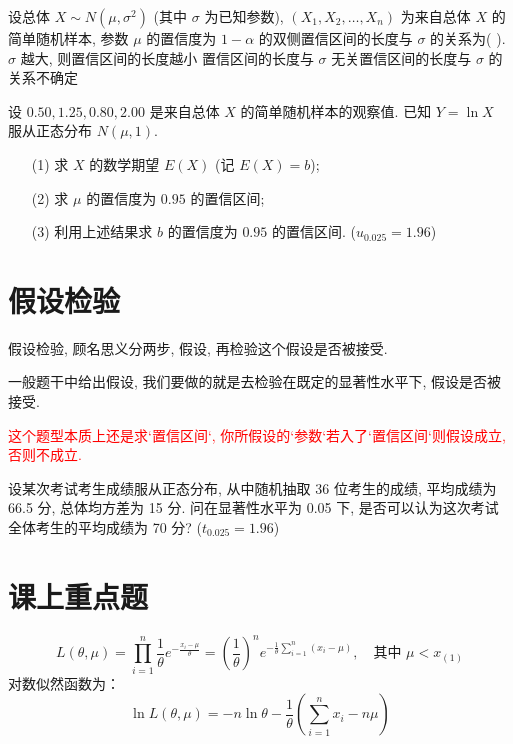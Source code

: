 \documentclass[padp]{ExBook}
\begin{document}
\begin{qitems}
\begin{bbox}
    \end{bbox}
    \begin{bbox}
        \qitem    设总体 $X \sim N(\mu, \sigma^2)$ (其中 $\sigma$ 为已知参数), $(X_1, X_2, \dots, X_n)$ 为来自总体 $X$ 的简单随机样本, 参数 $\mu$ 的置信度为 $1-\alpha$ 的双侧置信区间的长度与 $\sigma$ 的关系为( \quad ).
{$\sigma$ 越大, 则置信区间的长度越小}
{置信区间的长度与 $\sigma$ 无关}{置信区间的长度与 $\sigma$ 的关系不确定}
    \end{bbox}
    \begin{bbox}
        \qitem  设 $0.50, 1.25, 0.80, 2.00$ 是来自总体 $X$ 的简单随机样本的观察值. 已知 $Y=\ln X$ 服从正态分布 $N(\mu, 1)$.
\begin{enumerate}
    \item[(1)] 求 $X$ 的数学期望 $E(X)$ (记 $E(X)=b$);
    \item[(2)] 求 $\mu$ 的置信度为 $0.95$ 的置信区间;
    \item[(3)] 利用上述结果求 $b$ 的置信度为 $0.95$ 的置信区间. ($u_{0.025}=1.96$)
\end{enumerate} 
    \end{bbox}
 
\end{qitems}
\section{假设检验}
假设检验, 顾名思义分两步, 假设, 再检验这个假设是否被接受.

一般题干中给出假设, 我们要做的就是去检验在既定的显著性水平下, 假设是否被接受.

\textcolor{red}{这个题型本质上还是求`置信区间`, 你所假设的`参数`若入了`置信区间`则假设成立, 否则不成立.}

\begin{qitems}

    \begin{bbox}
        \qitem  设某次考试考生成绩服从正态分布, 从中随机抽取 36 位考生的成绩, 平均成绩为 66.5 分, 总体均方差为 15 分. 问在显著性水平为 0.05 下, 是否可以认为这次考试全体考生的平均成绩为 70 分? ($t_{0.025} = 1.96$)
    \end{bbox}
    
\end{qitems}

\section{课上重点题}
$$L(\theta, \mu) = \prod_{i=1}^n \frac{1}{\theta}e^{-\frac{x_i-\mu}{\theta}} = \left(\frac{1}{\theta}\right)^n e^{-\frac{1}{\theta}\sum_{i=1}^n(x_i-\mu)}, \quad \text{其中 } \mu < x_{(1)}$$对数似然函数为：$$\ln L(\theta, \mu) = -n\ln\theta - \frac{1}{\theta}\left(\sum_{i=1}^n x_i - n\mu\right)$$
\end{document}
